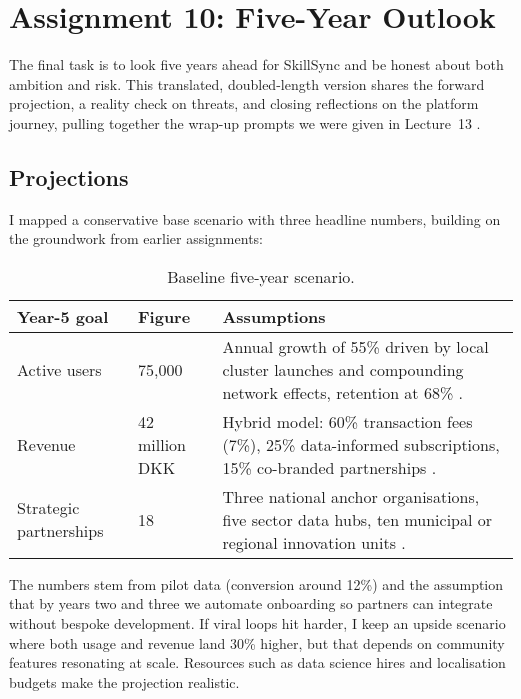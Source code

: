 \section*{Assignment 10: Five-Year Outlook}

The final task is to look five years ahead for SkillSync and be honest about both ambition and risk. This translated, doubled-length version shares the forward projection, a reality check on threats, and closing reflections on the platform journey, pulling together the wrap-up prompts we were given in Lecture~13 \citep{Lecture13}.

\subsection*{Projections}
I mapped a conservative base scenario with three headline numbers, building on the groundwork from earlier assignments:\newline
\begin{table}[h]
  \centering
  \begin{tabular}{p{3cm}p{3.5cm}p{6cm}}
    \toprule
    \textbf{Year-5 goal} & \textbf{Figure} & \textbf{Assumptions} \\
    \midrule
    Active users & 75,000 & Annual growth of 55\% driven by local cluster launches and compounding network effects, retention at 68\% \citep{Choudary2016,Srnicek2017}. \\
    Revenue & 42 million DKK & Hybrid model: 60\% transaction fees (7\%), 25\% data-informed subscriptions, 15\% co-branded partnerships \citep{ShapiroVarian1999}. \\
    Strategic partnerships & 18 & Three national anchor organisations, five sector data hubs, ten municipal or regional innovation units \citep{Reillier2017}. \\
    \bottomrule
  \end{tabular}
  \caption{Baseline five-year scenario.}
\end{table}

The numbers stem from pilot data (conversion around 12\%) and the assumption that by years two and three we automate onboarding so partners can integrate without bespoke development. If viral loops hit harder, I keep an upside scenario where both usage and revenue land 30\% higher, but that depends on community features resonating at scale. Resources such as data science hires and localisation budgets make the projection realistic.


